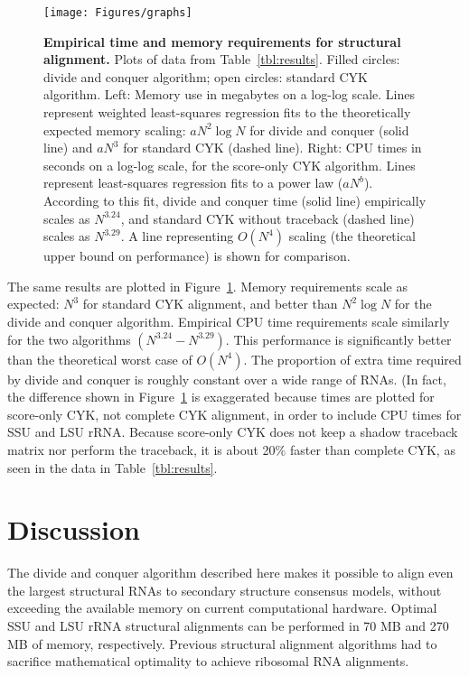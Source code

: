 \documentclass[11pt]{article}
\begin{document}
\begin{figure}[ht]
\begin{center}
\texttt{[image: Figures/graphs]}
\end{center}
\caption{\textbf{Empirical time and memory requirements for structural
alignment.} Plots of data from Table~\ref{tbl:results}. Filled
circles: divide and conquer algorithm; open circles: standard CYK
algorithm. Left: Memory use in megabytes on a log-log scale. Lines
represent weighted least-squares regression fits to the theoretically
expected memory scaling: $aN^2 \log N$ for divide and conquer (solid
line) and $aN^3$ for standard CYK (dashed line). Right: CPU times in
seconds on a log-log scale, for the score-only CYK algorithm. Lines
represent least-squares regression fits to a power law ($aN^b$).
According to this fit, divide and conquer time (solid line)
empirically scales as $N^{3.24}$, and standard CYK without traceback
(dashed line) scales as $N^{3.29}$. A line representing $O(N^4)$
scaling (the theoretical upper bound on performance) is shown for
comparison.}
\label{fig:graphs}
\end{figure}

The same results are plotted in Figure~\ref{fig:graphs}. Memory
requirements scale as expected: $N^3$ for standard CYK alignment, and
better than $N^2 \log N$ for the divide and conquer algorithm.
Empirical CPU time requirements scale similarly for the two algorithms
$(N^{3.24}-N^{3.29})$. This performance is significantly better than
the theoretical worst case of $O(N^4)$. The proportion of extra time
required by divide and conquer is roughly constant over a wide range
of RNAs. (In fact, the difference shown in Figure~\ref{fig:graphs} is
exaggerated because times are plotted for score-only CYK, not complete
CYK alignment, in order to include CPU times for SSU and LSU
rRNA. Because score-only CYK does not keep a shadow traceback matrix
nor perform the traceback, it is about 20\% faster than complete CYK,
as seen in the data in Table~\ref{tbl:results}.

\section{Discussion}

The divide and conquer algorithm described here makes it possible to
align even the largest structural RNAs to secondary structure
consensus models, without exceeding the available memory on current
computational hardware. Optimal SSU and LSU rRNA structural alignments
can be performed in 70 MB and 270 MB of memory, respectively. Previous
structural alignment algorithms had to sacrifice mathematical
optimality to achieve ribosomal RNA alignments.
\end{document}
